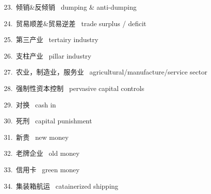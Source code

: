 \documentclass[a4paper, 12pt]{article}
\begin{document}
\begin{multicols}{2}
\begin{flushleft}
23.\ 倾销\&反倾销 \ dumping \& anti-dumping
\end{flushleft}

\begin{flushleft}
24.\ 贸易顺差\&贸易逆差 \ trade surplus / deficit
\end{flushleft}
\end{multicols}

\begin{multicols}{2}
\begin{flushleft}
25.\ 第三产业 \ tertairy industry
\end{flushleft}

\begin{flushleft}
26.\ 支柱产业 \ pillar industry
\end{flushleft}
\end{multicols}

\begin{multicols}{2}
\begin{flushleft}
27.\ 农业，制造业，服务业 \ agricultural/manufacture/service sector
\end{flushleft}

\begin{flushleft}
28.\ 强制性资本控制 \ pervasive capital controls
\end{flushleft}
\end{multicols}

\begin{multicols}{2}
\begin{flushleft}
29.\ 对换 \ cash in
\end{flushleft}

\begin{flushleft}
30.\ 死刑 \ capital punishment
\end{flushleft}
\end{multicols}

\begin{multicols}{2}
\begin{flushleft}
31.\ 新贵 \ new money
\end{flushleft}

\begin{flushleft}
32.\ 老牌企业 \ old money
\end{flushleft}
\end{multicols}

\begin{multicols}{2}
\begin{flushleft}
33.\ 信用卡 \ green money
\end{flushleft}

\begin{flushleft}
34.\ 集装箱航运 \ catainerized shipping
\end{flushleft}
\end{multicols}
\end{document}
